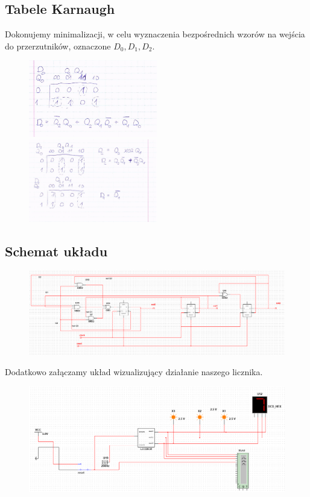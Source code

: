 \documentclass{article}
\begin{document}
\subsection{Tabele Karnaugh}
Dokonujemy minimalizacji, w celu wyznaczenia bezpośrednich wzorów na wejścia do przerzutników, oznaczone $D_{0}, D_{1},D_{2}$.
\begin{figure}[H]
\includegraphics[width = 0.5\textwidth]{3a_karnaugh_2}
\includegraphics[width = 0.5\textwidth]{3a_karnaugh_1}
\end{figure}
\subsection{Schemat układu}
\begin{figure}[H]
\includegraphics[width = \textwidth]{3a_uklad}
\end{figure}
Dodatkowo załączamy układ wizualizujący działanie naszego licznika.
\begin{figure}[H]
\includegraphics[width = \textwidth]{3a_wizualizacja}
\end{figure}
\end{document}
